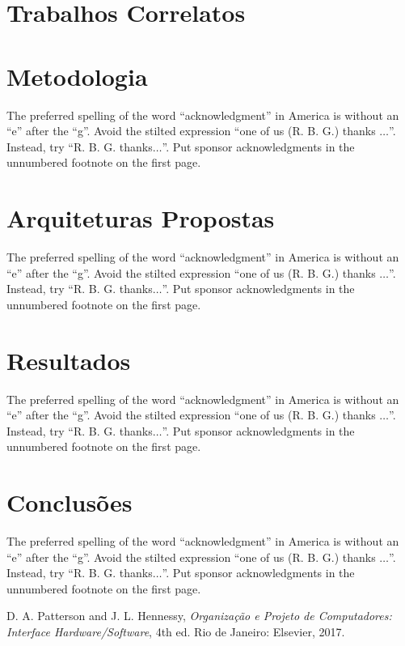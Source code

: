\documentclass[conference]{IEEEtran}
\begin{document}
\section{Trabalhos Correlatos}


\section{Metodologia}
The preferred spelling of the word ``acknowledgment'' in America is without 
an ``e'' after the ``g''. Avoid the stilted expression ``one of us (R. B. 
G.) thanks $\ldots$''. Instead, try ``R. B. G. thanks$\ldots$''. Put sponsor 
acknowledgments in the unnumbered footnote on the first page.

\section{Arquiteturas Propostas}
The preferred spelling of the word ``acknowledgment'' in America is without 
an ``e'' after the ``g''. Avoid the stilted expression ``one of us (R. B. 
G.) thanks $\ldots$''. Instead, try ``R. B. G. thanks$\ldots$''. Put sponsor 
acknowledgments in the unnumbered footnote on the first page.

\section{Resultados}
The preferred spelling of the word ``acknowledgment'' in America is without 
an ``e'' after the ``g''. Avoid the stilted expression ``one of us (R. B. 
G.) thanks $\ldots$''. Instead, try ``R. B. G. thanks$\ldots$''. Put sponsor 
acknowledgments in the unnumbered footnote on the first page.

\section{Conclusões}
The preferred spelling of the word ``acknowledgment'' in America is without 
an ``e'' after the ``g''. Avoid the stilted expression ``one of us (R. B. 
G.) thanks $\ldots$''. Instead, try ``R. B. G. thanks$\ldots$''. Put sponsor 
acknowledgments in the unnumbered footnote on the first page.

\begin{thebibliography}{00}
 D. A. Patterson and J. L. Hennessy, \textit{Organização e Projeto de Computadores: Interface Hardware/Software}, 4th ed. Rio de Janeiro: Elsevier, 2017.
\end{thebibliography}
\end{document}
